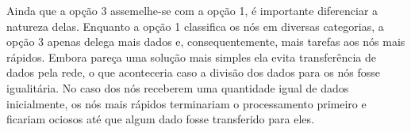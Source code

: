 Ainda que a opção 3 assemelhe-se com a opção 1, é importante diferenciar a natureza delas. Enquanto a opção 1 classifica os nós em diversas categorias, a opção 3 apenas delega mais dados e, consequentemente, mais tarefas aos nós mais rápidos. Embora pareça uma solução mais simples ela evita transferência de dados pela rede, o que aconteceria caso a divisão dos dados para os nós fosse igualitária. No caso dos nós receberem uma quantidade igual de dados inicialmente, os nós mais rápidos terminariam o processamento primeiro e ficariam ociosos até que algum dado fosse transferido para eles.
%
%
%		
%
